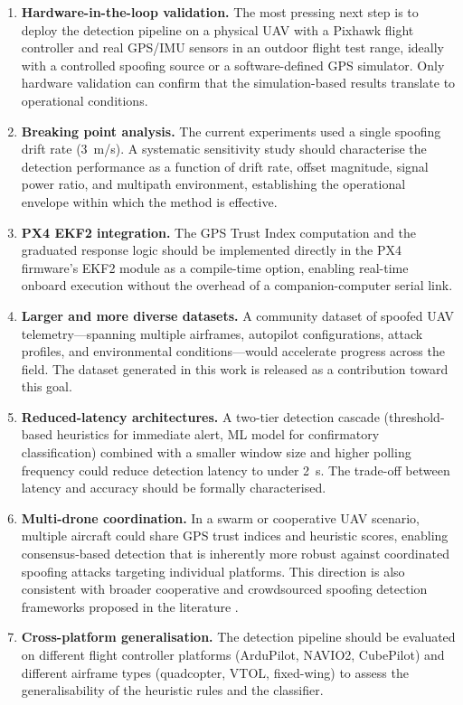 \documentclass[electronics,article,accept,moreauthors]{Definitions/mdpi}
\begin{document}
\begin{enumerate}
    \item \textbf{Hardware-in-the-loop validation.} The most pressing next step is to deploy the detection pipeline on a physical UAV with a Pixhawk flight controller and real GPS/IMU sensors in an outdoor flight test range, ideally with a controlled spoofing source or a software-defined GPS simulator. Only hardware validation can confirm that the simulation-based results translate to operational conditions.
    \item \textbf{Breaking point analysis.} The current experiments used a single spoofing drift rate (3~m/s). A systematic sensitivity study should characterise the detection performance as a function of drift rate, offset magnitude, signal power ratio, and multipath environment, establishing the operational envelope within which the method is effective.
    \item \textbf{PX4 EKF2 integration.} The GPS Trust Index computation and the graduated response logic should be implemented directly in the PX4 firmware's EKF2 module as a compile-time option, enabling real-time onboard execution without the overhead of a companion-computer serial link.
    \item \textbf{Larger and more diverse datasets.} A community dataset of spoofed UAV telemetry---spanning multiple airframes, autopilot configurations, attack profiles, and environmental conditions---would accelerate progress across the field. The dataset generated in this work is released as a contribution toward this goal.
    \item \textbf{Reduced-latency architectures.} A two-tier detection cascade (threshold-based heuristics for immediate alert, ML model for confirmatory classification) combined with a smaller window size and higher polling frequency could reduce detection latency to under 2~s. The trade-off between latency and accuracy should be formally characterised.
    \item \textbf{Multi-drone coordination.} In a swarm or cooperative UAV scenario, multiple aircraft could share GPS trust indices and heuristic scores, enabling consensus-based detection that is inherently more robust against coordinated spoofing attacks targeting individual platforms. This direction is also consistent with broader cooperative and crowdsourced spoofing detection frameworks proposed in the literature \citep{jansen2018}.
    \item \textbf{Cross-platform generalisation.} The detection pipeline should be evaluated on different flight controller platforms (ArduPilot, NAVIO2, CubePilot) and different airframe types (quadcopter, VTOL, fixed-wing) to assess the generalisability of the heuristic rules and the classifier.

\end{enumerate}
\end{document}
